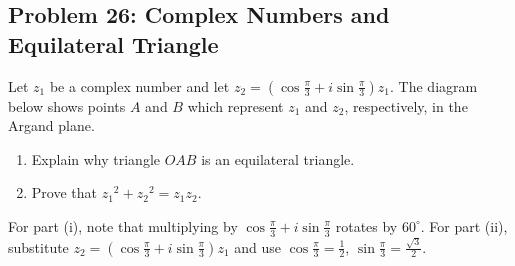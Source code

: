 \subsection{Problem 26: Complex Numbers and Equilateral Triangle}

\begin{problem}
Let $z_1$ be a complex number and let $z_2 = \left(\cos\frac{\pi}{3} + i\sin\frac{\pi}{3}\right)z_1$. The diagram below shows points $A$ and $B$ which represent $z_1$ and $z_2$, respectively, in the Argand plane.

\vspace{0.5em}
\noindent
\begin{center}
\end{center}
\vspace{0.3em}

\begin{enumerate}
    \item[(i)] Explain why triangle $OAB$ is an equilateral triangle.
    
    \item[(ii)] Prove that ${z_1}^2 + {z_2}^2 = z_1 z_2$.
\end{enumerate}
\end{problem}

\begin{hint}
For part (i), note that multiplying by $\cos\frac{\pi}{3} + i\sin\frac{\pi}{3}$ rotates by $60^\circ$. For part (ii), substitute $z_2 = \left(\cos\frac{\pi}{3} + i\sin\frac{\pi}{3}\right)z_1$ and use $\cos\frac{\pi}{3} = \tfrac{1}{2}$, $\sin\frac{\pi}{3} = \tfrac{\sqrt{3}}{2}$.
\end{hint}


